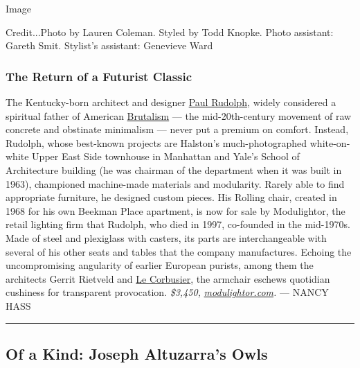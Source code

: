 Image

Credit...Photo by Lauren Coleman. Styled by Todd Knopke. Photo
assistant: Gareth Smit. Stylist's assistant: Genevieve Ward

\hypertarget{the-return-of-a-futurist-classic}{%
\subsubsection{The Return of a Futurist
Classic}\label{the-return-of-a-futurist-classic}}

The Kentucky-born architect and designer
\href{https://www.nytimes3xbfgragh.onion/1997/08/09/arts/paul-rudolph-is-dead-at-78-modernist-architect-of-the-60-s.html}{Paul
Rudolph}, widely considered a spiritual father of American
\href{https://www.nytimes3xbfgragh.onion/2016/10/06/t-magazine/design/brutalist-architecture-revival.html}{Brutalism}
--- the mid-20th-century movement of raw concrete and obstinate
minimalism --- never put a premium on comfort. Instead, Rudolph, whose
best-known projects are Halston's much-photographed white-on-white Upper
East Side townhouse in Manhattan and Yale's School of Architecture
building (he was chairman of the department when it was built in 1963),
championed machine-made materials and modularity. Rarely able to find
appropriate furniture, he designed custom pieces. His Rolling chair,
created in 1968 for his own Beekman Place apartment, is now for sale by
Modulightor, the retail lighting firm that Rudolph, who died in 1997,
co-founded in the mid-1970s. Made of steel and plexiglass with casters,
its parts are interchangeable with several of his other seats and tables
that the company manufactures. Echoing the uncompromising angularity of
earlier European purists, among them the architects Gerrit Rietveld and
\href{https://www.nytimes3xbfgragh.onion/topic/person/le-corbusier}{Le
Corbusier}, the armchair eschews quotidian cushiness for transparent
provocation. \emph{\$3,450,}
\href{http://modulightor.com/}{\emph{modulightor.com}}\emph{.} --- NANCY
HASS

\begin{center}\rule{0.5\linewidth}{\linethickness}\end{center}

\href{https://www.nytimes3xbfgragh.onion/slideshow/2019/11/08/t-magazine/of-a-kind-joseph-altuzarras-owls.html}{}

\hypertarget{of-a-kind-joseph-altuzarras-owls}{%
\subsection{Of a Kind: Joseph Altuzarra's
Owls}\label{of-a-kind-joseph-altuzarras-owls}}

